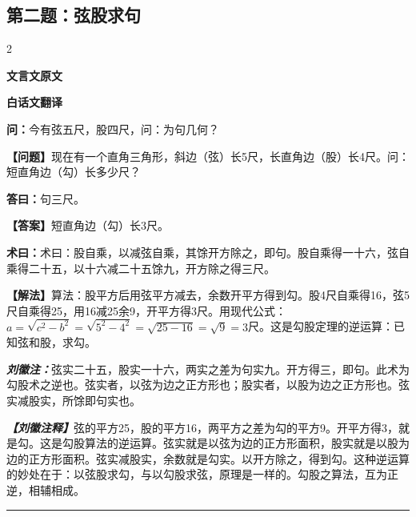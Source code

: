\documentclass[10pt,a4paper]{article}
\newcommand{\wen}[1]{\textbf{\color{problemcolor}问：}#1\par}
\newcommand{\da}[1]{\textbf{答曰：}#1\par}
\newcommand{\shu}[1]{\textbf{术曰：}#1\par}
\newcommand{\liuhui}[1]{{\color{commentarycolor}\textit{\textbf{刘徽注：}}#1\par}}
\newcommand{\classicalheader}[1]{{\centering\large\bfseries\color{classicalcolor} #1\par\vspace{0.5em}}}
\newcommand{\wenmodern}[1]{\textbf{\color{moderncolor}【问题】}#1\par}
\newcommand{\damodern}[1]{\textbf{【答案】}#1\par}
\newcommand{\shumodern}[1]{\textbf{【解法】}#1\par}
\newcommand{\liuhuimodern}[1]{{\color{commentarycolor}\textit{\textbf{【刘徽注释】}}#1\par}}
\newcommand{\modernheader}[1]{{\centering\large\bfseries\color{moderncolor} #1\par\vspace{0.5em}}}
\newcommand{\problemsec}[1]{\subsection*{#1}}
\begin{document}
\problemsec{第二题：弦股求句}
\begin{paracol}{2}
\classicalheader{文言文原文}
\switchcolumn
\modernheader{白话文翻译}
\switchcolumn*

\wen{今有弦五尺，股四尺，问：为句几何？}

\switchcolumn

\wenmodern{现在有一个直角三角形，斜边（弦）长5尺，长直角边（股）长4尺。问：短直角边（勾）长多少尺？}

\switchcolumn*

\da{句三尺。}

\switchcolumn

\damodern{短直角边（勾）长3尺。}

\switchcolumn*

\shu{术曰：股自乘，以减弦自乘，其馀开方除之，即句。股自乘得一十六，弦自乘得二十五，以十六减二十五馀九，开方除之得三尺。}

\switchcolumn

\shumodern{算法：股平方后用弦平方减去，余数开平方得到勾。股4尺自乘得16，弦5尺自乘得25，用16减25余9，开平方得3尺。用现代公式：$a=\sqrt{c^2-b^2}=\sqrt{5^2-4^2}=\sqrt{25-16}=\sqrt{9}=3$尺。这是勾股定理的逆运算：已知弦和股，求勾。}

\switchcolumn*

\liuhui{弦实二十五，股实一十六，两实之差为句实九。开方得三，即句。此术为勾股术之逆也。弦实者，以弦为边之正方形也；股实者，以股为边之正方形也。弦实减股实，所馀即句实也。}

\switchcolumn

\liuhuimodern{弦的平方25，股的平方16，两平方之差为勾的平方9。开平方得3，就是勾。这是勾股算法的逆运算。弦实就是以弦为边的正方形面积，股实就是以股为边的正方形面积。弦实减股实，余数就是勾实。以开方除之，得到勾。这种逆运算的妙处在于：以弦股求勾，与以勾股求弦，原理是一样的。勾股之算法，互为正逆，相辅相成。}

\end{paracol}

\vspace{0.3cm}
\hrule
\vspace{0.3cm}
\end{document}
